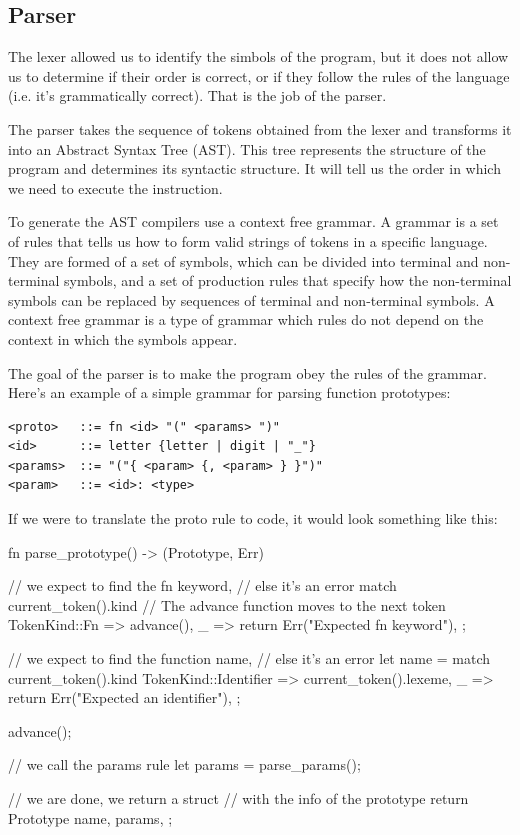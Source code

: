 ﻿\documentclass[10pt,a4paper,twocolumn,twoside]{article}
\begin{document}
\subsection{Parser}
The lexer allowed us to identify the simbols of the program, but it does not 
allow us to determine if their order is correct, or if they follow the rules of
the language (i.e. it's grammatically correct). That is the job of the parser.

The parser takes the sequence of tokens obtained from the lexer and
transforms it into an Abstract Syntax Tree (AST). This tree represents the
structure of the program and determines its syntactic structure. It will tell us
the order in which we need to execute the instruction.

To generate the AST compilers use a context free grammar. A grammar is a set of
rules that tells us how to form valid strings of tokens in a specific language.
They are formed of a set of symbols, which can be divided into terminal and
non-terminal symbols, and a set of production rules that specify how the
non-terminal symbols can be replaced by sequences of terminal and non-terminal
symbols. A context free grammar is a type of grammar which rules do not depend
on the context in which the symbols appear.

The goal of the parser is to make the program obey the rules of the grammar.
Here's an example of a simple grammar for parsing function prototypes:

\begin{small}
\begin{verbatim}
<proto>   ::= fn <id> "(" <params> ")"
<id>      ::= letter {letter | digit | "_"}
<params>  ::= "("{ <param> {, <param> } }")"
<param>   ::= <id>: <type>
\end{verbatim}
\end{small}

If we were to translate the proto rule to code, it would look something like 
this:

\begin{code}
fn parse_prototype() -> (Prototype, Err) {
    // we expect to find the fn keyword,
    // else it's an error
    match current_token().kind {
        // The advance function moves to the next token
        TokenKind::Fn => advance(),
        _ => return Err("Expected fn keyword"),
    };

    // we expect to find the function name,
    // else it's an error
    let name = match current_token().kind {
        TokenKind::Identifier => current_token().lexeme,
        _ => return Err("Expected an identifier"),
    };

    advance();

    // we call the params rule
    let params = parse_params();

    // we are done, we return a struct 
    // with the info of the prototype
    return Prototype { 
        name,
        params,
    };
}
\end{code}
\end{document}
